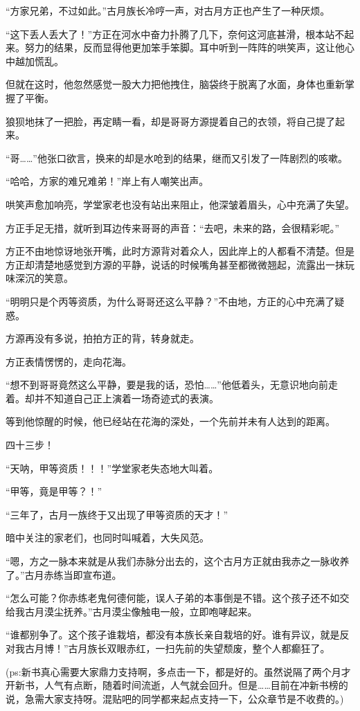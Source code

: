 \begin{this_body}
“方家兄弟，不过如此。”古月族长冷哼一声，对古月方正也产生了一种厌烦。

“这下丢人丢大了！”方正在河水中奋力扑腾了几下，奈何这河底甚滑，根本站不起来。努力的结果，反而显得他更加笨手笨脚。耳中听到一阵阵的哄笑声，这让他心中越加慌乱。

但就在这时，他忽然感觉一股大力把他拽住，脑袋终于脱离了水面，身体也重新掌握了平衡。

狼狈地抹了一把脸，再定睛一看，却是哥哥方源提着自己的衣领，将自己提了起来。

“哥……”他张口欲言，换来的却是水呛到的结果，继而又引发了一阵剧烈的咳嗽。

“哈哈，方家的难兄难弟！”岸上有人嘲笑出声。

哄笑声愈加响亮，学堂家老也没有站出来阻止，他深皱着眉头，心中充满了失望。

方正手足无措，就听到耳边传来哥哥的声音：“去吧，未来的路，会很精彩呢。”

方正不由地惊讶地张开嘴，此时方源背对着众人，因此岸上的人都看不清楚。但是方正却清楚地感觉到方源的平静，说话的时候嘴角甚至都微微翘起，流露出一抹玩味深沉的笑意。

“明明只是个丙等资质，为什么哥哥还这么平静？”不由地，方正的心中充满了疑惑。

方源再没有多说，拍拍方正的背，转身就走。

方正表情愣愣的，走向花海。

“想不到哥哥竟然这么平静，要是我的话，恐怕……”他低着头，无意识地向前走着。却并不知道自己正上演着一场奇迹式的表演。

等到他惊醒的时候，他已经站在花海的深处，一个先前并未有人达到的距离。

四十三步！

“天呐，甲等资质！！！”学堂家老失态地大叫着。

“甲等，竟是甲等？！”

“三年了，古月一族终于又出现了甲等资质的天才！”

暗中关注的家老们，也同时叫喊着，大失风范。

“嗯，方之一脉本来就是从我们赤脉分出去的，这个古月方正就由我赤之一脉收养了。”古月赤练当即宣布道。

“怎么可能？你赤练老鬼何德何能，误人子弟的本事倒是不错。这个孩子还不如交给我古月漠尘抚养。”古月漠尘像触电一般，立即咆哮起来。

“谁都别争了。这个孩子谁栽培，都没有本族长亲自栽培的好。谁有异议，就是反对我古月博！”古月族长双眼赤红，一扫先前的失望颓废，整个人都癫狂了。

(ps:新书真心需要大家鼎力支持啊，多点击一下，都是好的。虽然说隔了两个月才开新书，人气有点断，随着时间流逝，人气就会回升。但是……目前在冲新书榜的说，急需大家支持呀。混贴吧的同学都来起点支持一下，公众章节是不收费的。)

\end{this_body}

